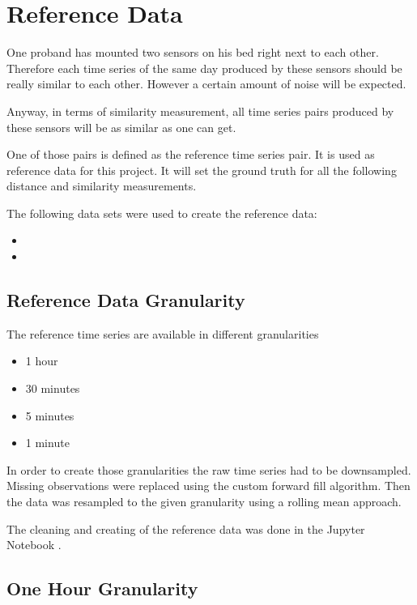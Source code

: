 \chapter{Reference Data}

One proband has mounted two sensors on his bed right next to each other. Therefore each time series of the same day produced by these sensors should be really similar to each other. However a certain amount of noise will be expected. 

Anyway, in terms of similarity measurement, all time series pairs produced by these sensors will be as similar as one can get.

One of those pairs is defined as the reference time series pair. It is used as reference data for this project. It will set the ground truth for all the following distance and similarity measurements.

The following data sets were used to create the reference data:

\begin{itemize}
  \item {}
  \item {}
\end{itemize}



\section{Reference Data Granularity}
The reference time series are available in different granularities

\begin{itemize}
  \item 1 hour
  \item 30 minutes
  \item 5 minutes
  \item 1 minute
\end{itemize}

In order to create those granularities the raw time series had to be downsampled.
Missing observations were replaced using the custom forward fill algorithm. Then the data was resampled to the given granularity using a rolling mean approach.

The cleaning and creating of the reference data was done in the Jupyter Notebook 
\newline {}.


\section{One Hour Granularity}

